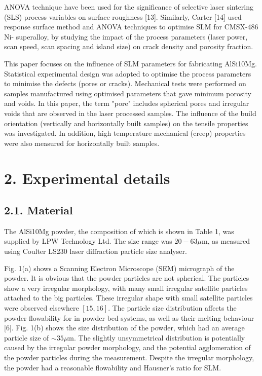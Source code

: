 \documentclass[10pt]{article}
\begin{document}
ANOVA technique have been used for the significance of selective laser sintering (SLS) process variables on surface roughness [13]. Similarly, Carter [14] used response surface method and ANOVA techniques to optimise SLM for CMSX-486 Ni- superalloy, by studying the impact of the process parameters (laser power, scan speed, scan spacing and island size) on crack density and porosity fraction.

This paper focuses on the influence of SLM parameters for fabricating AlSi10Mg. Statistical experimental design was adopted to optimise the process parameters to minimise the defects (pores or cracks). Mechanical tests were performed on samples manufactured using optimised parameters that gave minimum porosity and voids. In this paper, the term "pore" includes spherical pores and irregular voids that are observed in the laser processed samples. The influence of the build orientation (vertically and horizontally built samples) on the tensile properties was investigated. In addition, high temperature mechanical (creep) properties were also measured for horizontally built samples.

\section*{2. Experimental details}
\subsection*{2.1. Material}
The AlSi10Mg powder, the composition of which is shown in Table 1, was supplied by LPW Technology Ltd. The size range was $20-63 \mu \mathrm{m}$, as measured using Coulter LS230 laser diffraction particle size analyser.

Fig. 1(a) shows a Scanning Electron Microscope (SEM) micrograph of the powder. It is obvious that the powder particles are not spherical. The particles show a very irregular morphology, with many small irregular satellite particles attached to the big particles. These irregular shape with small satellite particles were observed elsewhere $[15,16]$. The particle size distribution affects the powder flowability for in powder bed systems, as well as their melting behaviour [6]. Fig. 1(b) shows the size distribution of the powder, which had an average particle size of $\sim 35 \mu \mathrm{m}$. The slightly unsymmetrical distribution is potentially caused by the irregular powder morphology, and the potential agglomeration of the powder particles during the measurement. Despite the irregular morphology, the powder had a reasonable flowability and Hausner's ratio for SLM.
\end{document}
